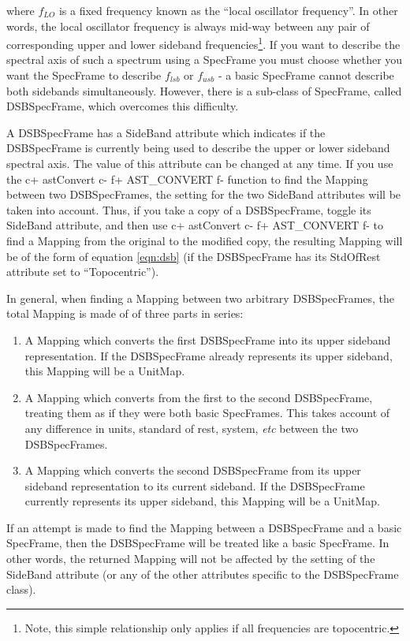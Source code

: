 \documentclass[twoside,11pt]{article}
\begin{document}
where $f_{LO}$ is a fixed frequency known as the ``local oscillator
frequency''. In other words, the local oscillator frequency is always
mid-way between any pair of corresponding upper and lower sideband
frequencies\footnote{Note, this simple relationship only applies if all
frequencies are topocentric.}. If you want to describe the spectral axis
of such a spectrum using a SpecFrame you must choose whether you want the
SpecFrame to describe $f_{lsb}$ or $f_{usb}$ - a basic SpecFrame cannot
describe both sidebands simultaneously. However, there is a sub-class of
SpecFrame, called DSBSpecFrame, which overcomes this difficulty.

A DSBSpecFrame has a SideBand attribute which indicates if the
DSBSpecFrame is currently being used to describe the upper or lower
sideband spectral axis. The value of this attribute can be changed at any
time. If you use the
c+
astConvert
c-
f+
AST\_CONVERT
f-
function to find the Mapping between two DSBSpecFrames, the setting for
the two SideBand attributes will be taken into account. Thus, if you take
a copy of a DSBSpecFrame, toggle its SideBand attribute, and then use
c+
astConvert
c-
f+
AST\_CONVERT
f-
to find a Mapping from the original to the modified copy, the resulting
Mapping will be of the form of equation \ref{eqn:dsb} (if the
DSBSpecFrame has its StdOfRest attribute set to ``Topocentric'').

In general, when finding a Mapping between two arbitrary DSBSpecFrames,
the total Mapping is made of of three parts in series:

\begin{enumerate}
\item A Mapping which converts the first DSBSpecFrame into its upper
sideband representation. If the DSBSpecFrame already represents its upper
sideband, this Mapping will be a UnitMap.
\item A Mapping which converts from the first to the second DSBSpecFrame,
treating them as if they were both basic SpecFrames. This takes account of
any difference in units, standard of rest, system, \emph{etc} between the
two DSBSpecFrames.
\item A Mapping which converts the second DSBSpecFrame from its upper
sideband representation to its current sideband. If the DSBSpecFrame
currently represents its upper sideband, this Mapping will be a UnitMap.
\end{enumerate}

If an attempt is made to find the Mapping between a DSBSpecFrame and a
basic SpecFrame, then the DSBSpecFrame will be treated like a basic
SpecFrame. In other words, the returned Mapping will not be affected by
the setting of the SideBand attribute (or any of the other attributes
specific to the DSBSpecFrame class).
\end{document}
